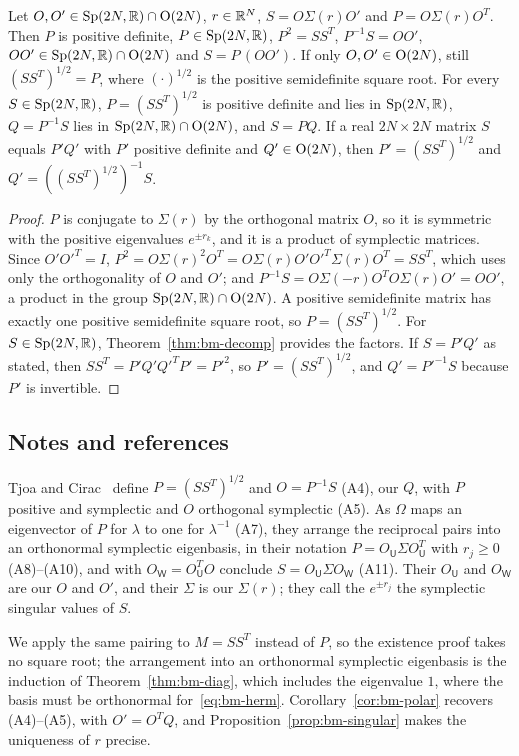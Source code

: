 \begin{vetdenv}
\begin{corollary}\label{cor:bm-polar}
Let $O,O'\in\mathrm{Sp}(2N,\mathbb R)\cap\mathrm{O}(2N)$, $r\in\mathbb R^N$, $S=O\Sigma(r)O'$ and $P=O\Sigma(r)O^T$. Then $P$ is positive definite, $P\in\mathrm{Sp}(2N,\mathbb R)$,
$P^2=SS^T$, $P^{-1}S=OO'$, $OO'\in\mathrm{Sp}(2N,\mathbb R)\cap\mathrm{O}(2N)$ and $S=P\,(OO')$. If only $O,O'\in\mathrm{O}(2N)$, still $(SS^T)^{1/2}=P$, where
$(\cdot)^{1/2}$ is the positive semidefinite square root. For every $S\in\mathrm{Sp}(2N,\mathbb R)$, $P=(SS^T)^{1/2}$ is positive definite and
lies in $\mathrm{Sp}(2N,\mathbb R)$, $Q=P^{-1}S$ lies in $\mathrm{Sp}(2N,\mathbb R)\cap\mathrm{O}(2N)$, and $S=PQ$. If a real $2N\times2N$ matrix $S$ equals $P'Q'$ with $P'$ positive
definite and $Q'\in\mathrm{O}(2N)$, then $P'=(SS^T)^{1/2}$ and $Q'=((SS^T)^{1/2})^{-1}S$.
\end{corollary}

\begin{proof}
$P$ is conjugate to $\Sigma(r)$ by the orthogonal matrix $O$, so it is symmetric with the positive eigenvalues
$e^{\pm r_k}$, and it is a product of symplectic matrices. Since $O'O'^T=I$,
$P^2=O\Sigma(r)^2O^T=O\Sigma(r)O'O'^T\Sigma(r)O^T=SS^T$, which uses only the orthogonality of $O$ and $O'$; and
$P^{-1}S=O\Sigma(-r)O^TO\Sigma(r)O'=OO'$, a product in the group $\mathrm{Sp}(2N,\mathbb R)\cap\mathrm{O}(2N)$. A positive semidefinite matrix has exactly
one positive semidefinite square root, so $P=(SS^T)^{1/2}$. For $S\in\mathrm{Sp}(2N,\mathbb R)$, Theorem~\ref{thm:bm-decomp} provides the
factors. If $S=P'Q'$ as stated, then $SS^T=P'Q'Q'^TP'=P'^2$, so $P'=(SS^T)^{1/2}$, and $Q'=P'^{-1}S$ because $P'$ is
invertible.
\end{proof}

\subsection*{Notes and references}

Tjoa and Cirac~\cite[App.~A]{tjoacirac} define $P=(SS^T)^{1/2}$ and $O=P^{-1}S$ (A4), our $Q$, with $P$ positive and
symplectic and $O$ orthogonal symplectic (A5). As $\Omega$ maps an eigenvector of $P$ for $\lambda$ to one for
$\lambda^{-1}$ (A7), they arrange the reciprocal pairs into an orthonormal symplectic eigenbasis, in their notation
$P=O_{\mathsf U}\Sigma O_{\mathsf U}^T$ with $r_j\ge0$ (A8)--(A10), and with $O_{\mathsf W}=O_{\mathsf U}^TO$ conclude
$S=O_{\mathsf U}\Sigma O_{\mathsf W}$ (A11). Their $O_{\mathsf U}$ and $O_{\mathsf W}$ are our $O$ and $O'$, and their
$\Sigma$ is our $\Sigma(r)$; they call the $e^{\pm r_j}$ the symplectic singular values of $S$.

We apply the same pairing to $M=SS^T$ instead of $P$, so the existence proof takes no square root; the arrangement
into an orthonormal symplectic eigenbasis is the induction of Theorem~\ref{thm:bm-diag}, which includes the
eigenvalue $1$, where the basis must be orthonormal for~\eqref{eq:bm-herm}. Corollary~\ref{cor:bm-polar} recovers
(A4)--(A5), with $O'=O^TQ$, and Proposition~\ref{prop:bm-singular} makes the uniqueness of $r$ precise.


\end{vetdenv}
